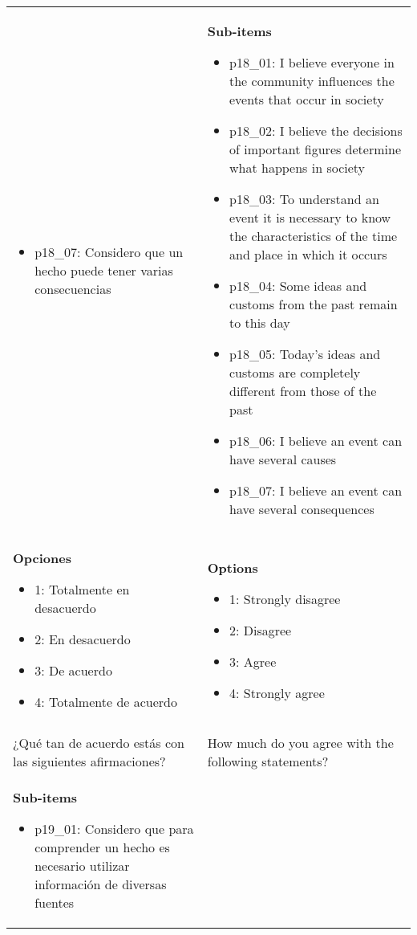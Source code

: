 \documentclass[11pt]{article}
\begin{document}
\begin{longtable}{@{}LL@{}}
\begin{itemize}[leftmargin=*]
\item p18\_07: Considero que un hecho puede tener varias consecuencias\end{itemize} & \textbf{Sub-items}\par\begin{itemize}[leftmargin=*]\item p18\_01: I believe everyone in the community influences the events that occur in society
\item p18\_02: I believe the decisions of important figures determine what happens in society
\item p18\_03: To understand an event it is necessary to know the characteristics of the time and place in which it occurs
\item p18\_04: Some ideas and customs from the past remain to this day
\item p18\_05: Today's ideas and customs are completely different from those of the past
\item p18\_06: I believe an event can have several causes
\item p18\_07: I believe an event can have several consequences\end{itemize} \\
\textbf{Opciones}\par\begin{itemize}[leftmargin=*]\item 1: Totalmente en desacuerdo
\item 2: En desacuerdo
\item 3: De acuerdo
\item 4: Totalmente de acuerdo\end{itemize} & \textbf{Options}\par\begin{itemize}[leftmargin=*]\item 1: Strongly disagree
\item 2: Disagree
\item 3: Agree
\item 4: Strongly agree\end{itemize} \\
\addlinespace[4pt]
 \\ 
¿Qué tan de acuerdo estás con las siguientes afirmaciones? & How much do you agree with the following statements? \\
\textbf{Sub-items}\par\begin{itemize}[leftmargin=*]\item p19\_01: Considero que para comprender un hecho es necesario utilizar información de diversas fuentes

\end{itemize}
\end{longtable}
\end{document}
